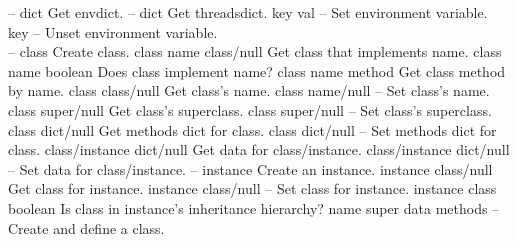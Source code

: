 \begin{longtable}{}
	{--}
	{{\bf {}}}
	{dict}
	{Get envdict.}
\hline
\optableent
	{--}
	{{\bf {}}}
	{dict}
	{Get threadsdict.}
\hline
\optableent
	{key val}
	{{\bf {}}}
	{--}
	{Set environment variable.}
\hline
\optableent
	{key}
	{{\bf {}}}
	{--}
	{Unset environment variable.}
\hline \hline
{} \\
\hline \hline
\optableent
	{--}
	{{\bf {}}}
	{class}
	{Create class.}
\hline
\optableent
	{class name}
	{{\bf {}}}
	{class/null}
	{Get class that implements name.}
\hline
\optableent
	{class name}
	{{\bf {}}}
	{boolean}
	{Does class implement name?}
\hline
\optableent
	{class name}
	{{\bf {}}}
	{method}
	{Get class method by name.}
\hline
\optableent
	{class}
	{{\bf {}}}
	{class/null}
	{Get class's name.}
\hline
\optableent
	{class name/null}
	{{\bf {}}}
	{--}
	{Set class's name.}
\hline
\optableent
	{class}
	{{\bf {}}}
	{super/null}
	{Get class's superclass.}
\hline
\optableent
	{class super/null}
	{{\bf {}}}
	{--}
	{Set class's superclass.}
\hline
\optableent
	{class}
	{{\bf {}}}
	{dict/null}
	{Get methods dict for class.}
\hline
\optableent
	{class dict/null}
	{{\bf {}}}
	{--}
	{Set methods dict for class.}
\hline
\optableent
	{class/instance}
	{{\bf {}}}
	{dict/null}
	{Get data for class/instance.}
\hline
\optableent
	{class/instance dict/null}
	{{\bf {}}}
	{--}
	{Set data for class/instance.}
\hline
\optableent
	{--}
	{{\bf {}}}
	{instance}
	{Create an instance.}
\hline
\optableent
	{instance}
	{{\bf {}}}
	{class/null}
	{Get class for instance.}
\hline
\optableent
	{instance class/null}
	{{\bf {}}}
	{--}
	{Set class for instance.}
\hline
\optableent
	{instance class}
	{{\bf {}}}
	{boolean}
	{Is class in instance's inheritance hierarchy?}
\hline
\optableent
	{name super data methods}
	{{\bf {}}}
	{--}
	{Create and define a class.}

\end{longtable}
